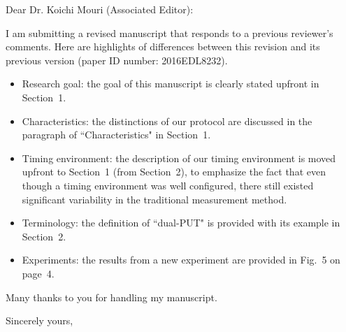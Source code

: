 \documentclass{letter} %
\begin{document}
\begin{letter}
\vspace{0.5in}
 
\opening{Dear Dr. Koichi Mouri (Associated Editor):} 
 
\noindent 

I am submitting a revised manuscript that responds to a previous reviewer's comments. 
Here are highlights of differences between this revision and its previous version (paper ID number: 2016EDL8232).

\begin{itemize}

\item Research goal: the goal of this manuscript is clearly stated upfront in Section~1. 

\item Characteristics: the distinctions of our protocol are discussed 
in the paragraph of ``Characteristics" in Section~1. 

\item Timing environment: the description of our timing environment 
is moved upfront to Section~1 (from Section~2), 
to emphasize the fact that even though a timing environment was well configured, 
there still existed significant variability in the traditional measurement method.

\item Terminology: the definition of ``dual-PUT" is provided with its example in Section~2. 

\item Experiments: the results from a new experiment are provided in Fig.~5 on page~4.

\end{itemize} 

Many thanks to you for handling my manuscript.

\closing{Sincerely yours,} 

\end{letter}
 
\end{document}
